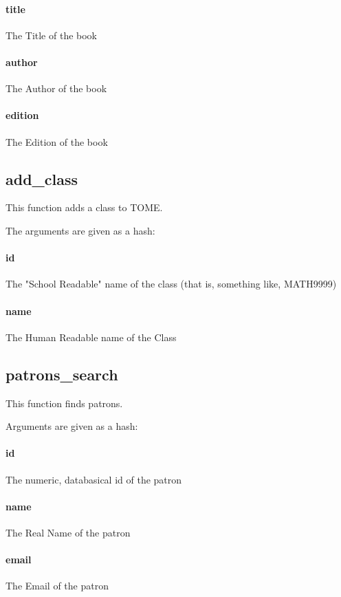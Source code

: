 \documentclass[12pt,titlepage]{article}
\begin{document}
\paragraph{title}
The Title of the book 

\paragraph{author}
The Author of the book 

\paragraph{edition}
The Edition of the book

\subsection{add\_class}
This function adds a class to TOME.

The arguments are given as a hash:
\paragraph{id}
The "School Readable" name of the class (that is, something like, MATH9999) 

\paragraph{name}
The Human Readable name of the Class

\subsection{patrons\_search}
This function finds patrons.

Arguments are given as a hash:
\paragraph{id}
The numeric, databasical id of the patron 

\paragraph{name}
The Real Name of the patron 

\paragraph{email}
The Email of the patron
\end{document}
